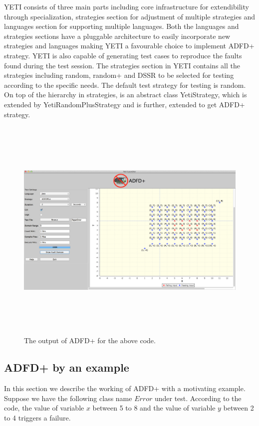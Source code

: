 \documentclass{acm_proc_article-sp}
\begin{document}
YETI consists of three main parts including core infrastructure for extendibility through specialization, strategies section for adjustment of multiple strategies and 
languages section for supporting multiple languages. Both the languages and strategies sections have a pluggable architecture to easily incorporate new strategies and 
languages making YETI a favourable choice to implement ADFD+ strategy. YETI is also capable of generating test cases to reproduce the faults found during the test session. 
The strategies section in YETI contains all the strategies including random, random+ and DSSR to be selected for testing according to the specific needs. The default test 
strategy for testing is random. On top of the hierarchy in strategies, is an abstract class YetiStrategy, which is extended by YetiRandomPlusStrategy and is further, extended to get 
ADFD+ strategy.

\begin{figure}[ht]
\centering
\includegraphics[width=17.5cm,height=11cm]{exampleError.png}
\caption{The output of ADFD+ for the above code.}
\label{fig:adfdPlusExample}
\end{figure}

\subsection{ADFD+ by an example}
In this section we describe the working of ADFD+ with a motivating example. Suppose we have the following class name $Error$ under test. According to the code, the value of variable $x$ between 5 to 8 and the value of variable $y$ between 2 to 4 triggers a failure.   
\end{document}
